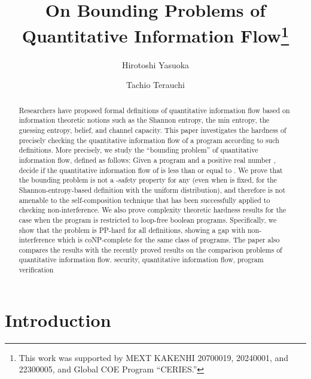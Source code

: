 \documentclass{llncs}
\begin{document}
\title{On Bounding Problems of Quantitative Information
  Flow\thanks{This work was supported by MEXT KAKENHI 20700019,
    20240001, and 22300005, and Global COE Program ``CERIES.''}}
\author{Hirotoshi Yasuoka \and Tachio Terauchi}
\maketitle

\begin{abstract}
Researchers have proposed formal definitions of quantitative
information flow based on information theoretic notions such as the
Shannon entropy, the min entropy, the guessing entropy, belief, and
channel capacity.  This paper investigates the hardness of precisely
checking the quantitative information flow of a program according to
such definitions.  More precisely, we study the ``bounding problem''
of quantitative information flow, defined as follows: Given a program
 and a positive real number , decide if the quantitative
information flow of  is less than or equal to .  We prove that
the bounding problem is not a -safety property for any  (even
when  is fixed, for the Shannon-entropy-based definition with the
uniform distribution), and therefore is not amenable to the
self-composition technique that has been successfully applied to
checking non-interference.  We also prove complexity theoretic
hardness results for the case when the program is restricted to
loop-free boolean programs.  Specifically, we show that the problem is
PP-hard for all definitions, showing a gap with non-interference which
is coNP-complete for the same class of programs.  The paper also
compares the results with the recently proved results on the
comparison problems of quantitative information flow.\newline
\newline
{} security, quantitative information flow, program verification

\end{abstract}



\section{Introduction}
\end{document}
